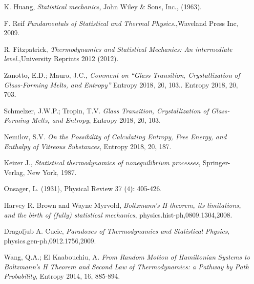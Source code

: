 \documentclass{article}
\begin{document}
  
\clearpage

\begin{thebibliography}{}


K. Huang, \emph{Statistical mechanics}, John Wiley \& Sons, Inc., (1963).

F. Reif {\it Fundamentals of Statistical and Thermal Physics.},Waveland Press Inc, 2009.

R. Fitzpatrick, {\it Thermodynamics and Statistical Mechanics: An intermediate level.},University Reprints 2012 (2012).

Zanotto, E.D.; Mauro, J.C., {\it Comment on “Glass Transition, Crystallization of Glass-Forming Melts, and Entropy”} Entropy 2018, 20, 103.. Entropy 2018, 20, 703.

Schmelzer, J.W.P.; Tropin, T.V. {\it Glass Transition, Crystallization of Glass-Forming Melts, and Entropy}, Entropy 2018, 20, 103.

Nemilov, S.V. {\it On the Possibility of Calculating Entropy, Free Energy, and Enthalpy of Vitreous Substances}, Entropy 2018, 20, 187.

Keizer J., \emph{Statistical thermodynamics of nonequilibrium processes}, Springer-Verlag, New York, 1987.

Onsager, L. (1931), Physical Review 37 (4): 405-426.

Harvey R. Brown and Wayne Myrvold, {\it Boltzmann's H-theorem, its limitations, and the birth of (fully) statistical mechanics}, physics.hist-ph,0809.1304,2008.

Dragoljub A. Cucic, {\it Paradoxes of Thermodynamics and Statistical Physics}, physics.gen-ph,0912.1756,2009.

Wang, Q.A.; El Kaabouchiu, A. {\it From Random Motion of Hamiltonian Systems to Boltzmann’s H Theorem and Second Law of Thermodynamics: a Pathway by Path Probability}, Entropy 2014, 16, 885-894.


\end{thebibliography}
\end{document}
